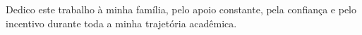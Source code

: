 
\begin{dedicatoria}

Dedico este trabalho à minha família, pelo apoio constante, pela confiança e pelo incentivo durante toda a minha trajetória acadêmica.

\end{dedicatoria}
